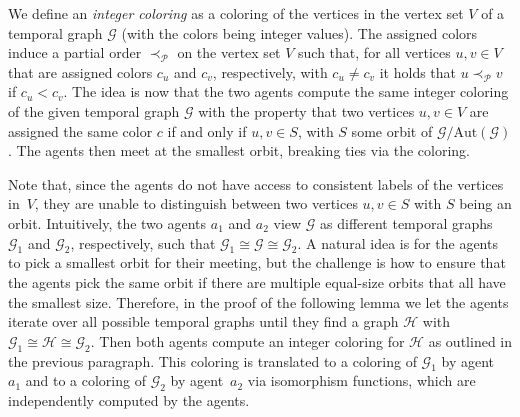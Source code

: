 \documentclass[10pt,a4paper]{article}
\newcommand{\auttg}{\ensuremath{\text{Aut}(\mathcal{G})}}
\newcommand{\torb}{\ensuremath{\mathcal{G}/\auttg}}
\begin{document}
We define an \textit{integer coloring} as a coloring of the vertices in the
vertex set $V$ of a temporal graph $\mathcal{G}$ (with the colors being integer
values). The assigned colors induce a partial order $\prec_\mathcal{P}$ on the
vertex set $V$ such that, for all vertices $u, v \in V$ that are assigned colors
$c_u$ and $c_v$, respectively, with $c_u\neq c_v$ it holds that $u
\prec_{\mathcal{P}} v$ if $c_u < c_v$. The idea is now that the two agents
compute the same integer coloring of the given temporal graph $\mathcal{G}$ with
the property that two vertices $u, v \in V$ are assigned the same color $c$ if
and only if $u, v \in S$, with $S$ some orbit of $\torb$. The agents then meet
at the smallest orbit, breaking ties via the coloring.

Note that, since the agents do not have access to consistent labels of the
vertices in~$V$, they are unable to distinguish between two vertices $u, v \in
S$ with $S$ being an orbit. Intuitively, the two agents $a_1$ and $a_2$ view
$\mathcal{G}$ as different temporal graphs $\mathcal{G}_1$ and $\mathcal{G}_2$,
respectively, such that
$\mathcal{G}_1\cong \mathcal{G}\cong \mathcal{G}_2$. A natural
idea is for the agents to pick a smallest orbit for their meeting, but the
challenge is how to ensure that the agents pick the same orbit if there are
multiple equal-size orbits that all have the smallest size. Therefore, in the
proof of the following lemma we let the agents iterate over all possible
temporal graphs until they find a graph $\mathcal{H}$ with
$\mathcal{G}_1\cong \mathcal{H}\cong \mathcal{G}_2$. Then both
agents compute an integer coloring for $\mathcal{H}$ as outlined in the previous
paragraph. This coloring is translated to a coloring of $\mathcal{G}_1$ by
agent~$a_1$ and to a coloring of $\mathcal{G}_2$ by agent~$a_2$ via isomorphism
functions, which are independently computed by the agents.
\end{document}
